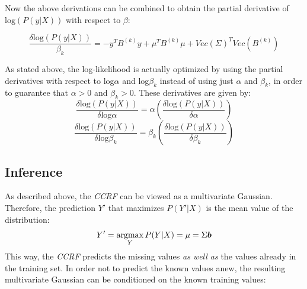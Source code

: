 Now the above derivations can be combined to obtain the partial derivative of $\text{log}(P(y|X))$ with respect to $\beta$:

\begin{equation}
\frac{\delta\text{log}(P(y|X))}{\beta_k} = -y^T B^{(k)} y + \mu^T B^{(k)} \mu + Vec(\Sigma)^T Vec(B^{(k)})
\end{equation}

As stated above, the log-likelihood is actually optimized by using the partial derivatives with respect to log$\alpha$ and log$\beta_k$ instead of using just $\alpha$ and $\beta_k$, in order to guarantee that $\alpha>0$ and $\beta_k>0$. These derivatives are given by:
\begin{equation}
\frac{\delta\text{log}(P(y|X))}{\delta\text{log} \alpha} = \alpha (\frac{\delta\text{log}(P(y|X))}{\delta \alpha})
\end{equation}
\begin{equation}
\frac{\delta\text{log}(P(y|X))}{\delta\text{log} \beta_k} = \beta_k (\frac{\delta\text{log}(P(y|X))}{\delta \beta_k})
\end{equation}




\subsection{Inference}

As described above, the \textit{CCRF} can be viewed as a multivariate Gaussian. Therefore, the prediction $Y'$ that maximizes $P(Y'|X)$ is the mean value of the distribution:
\begin{equation}
Y' = \operatorname*{argmax}_{Y} P(Y|X) = \mu = \Sigma\boldsymbol{b}
\end{equation}
This way, the \textit{CCRF} predicts the missing values \textit{as well as} the values already in the training set. In order not to predict the known values anew, the resulting multivariate Gaussian can be conditioned on the known training values:

